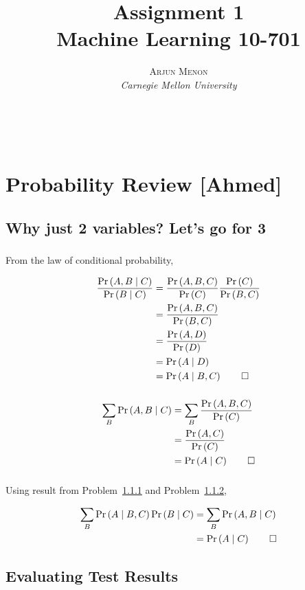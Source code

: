 \documentclass[letterpaper,10pt]{article} %
\title{\textbf{Assignment 1}\\ %
Machine Learning 10-701} %
\author{\textsc{Arjun Menon} %
\\{\textit{Carnegie Mellon University}}} %
\makeatletter
\newcommand{\pipe}{\;\middle\vert\;}
\newcommand{\condp}[2]{\Pr\left( #1 \pipe #2 \right)}
\newcommand{\pr}[1]{\Pr\left( #1 \right)}
\newcommand{\condpe}[2]{\frac{\pr{#1,#2}}{\pr{#2}}}
\newcommand{\prove}[1]{
\begin{Proof}
\begin{align*}
#1
\end{align*}
\end{Proof}
}
\renewcommand{\maketitle}{ %
\begin{flushright} %
{\LARGE\@title} %

{\large\@author} %
\\\@date %

\end{flushright}
}
\makeatother
\begin{document}
\maketitle %

\section{Probability Review [Ahmed]}

\subsection{Why just 2 variables? Let's go for 3}

\subsubsection{}\label{subsubsec:1}
From the law of conditional probability,

\prove{
\frac{\condp{A,B}{C}}{\condp{B}{C}} &= \frac{\pr{A,B,C}}{\pr{C}} \frac{\pr{C}}{\pr{B,C}}\\
                                    &= \frac{\pr{A,B,C}}{\pr{B,C}}\\
                                    &= \frac{\pr{A,D}}{\pr{D}}\\
                                    &= \condp{A}{D}\\
                                    &= \condp{A}{B,C} \qedhere
}

\subsubsection{}\label{subsubsec:2}
\prove{
\sum_{B}\condp{A,B}{C} &= \sum_{B}\condpe{A,B}{C}\\
&=\condpe{A}{C}\\
&=\condp{A}{C} \qedhere
}

\subsubsection{}
Using result from Problem~\ref{subsubsec:1} and Problem~\ref{subsubsec:2},
\prove{
\sum_{B}\condp{A}{B,C}\condp{B}{C} &= \sum_{B}\condp{A,B}{C}\\
&= \condp{A}{C} \qedhere
}

\subsection{Evaluating Test Results}
\end{document}
